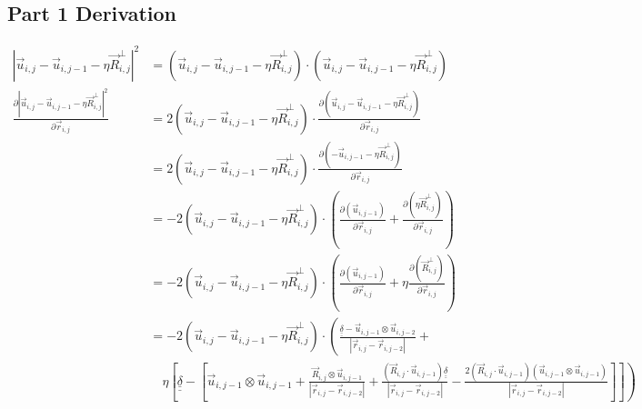 \documentclass{article}
\renewcommand{\ij}{_{i,j}}
\newcommand{\ijj}{_{i,j-1}}
\newcommand{\ijjj}{_{i,j-2}}
\newcommand{\magn}[1]{\left\vert #1 \right\vert }
\renewcommand{\part}[2]{\frac{\partial #1 }{\partial #2}}
\newcommand{\ten}[1]{\underline{\underline{#1}}}
\newcommand{\rij}{\vec{r} \ij}
\newcommand{\Rij}{\vec{R} \ij}
\newcommand{\rijjj}{\vec{r} \ijjj}
\newcommand{\uij}{\vec{u} \ij}
\newcommand{\uijj}{\vec{u} \ijj}
\newcommand{\uijjj}{\vec{u} \ijjj}
\begin{document}
\subsection{Part 1 Derivation}

\begin{align*}
  \magn{\uij - \uijj - \eta \Rij^\perp}^2 
  &=
  \left(\uij - \uijj - \eta \Rij^\perp\right)
  \cdot 
  \left(\uij - \uijj - \eta \Rij^\perp\right)
  \\
  \part{\magn{\uij - \uijj - \eta \Rij^\perp}^2 }{
    \rij 
  }
  &=
  2\left(\uij - \uijj - \eta \Rij^\perp\right) \cdot
  \part{\left(\uij - \uijj - \eta \Rij^\perp\right)}{\rij}
  \\
  &=
  2\left(\uij - \uijj - \eta \Rij^\perp\right) \cdot
  \part{\left(- \uijj - \eta \Rij^\perp\right)}{\rij}
  \\
  &=
  -
  2\left(\uij - \uijj - \eta \Rij^\perp\right) \cdot
  \left(
  \part{\left(\uijj \right)}{\rij}
  +
  \part{\left( \eta \Rij^\perp\right)}{\rij}
  \right)
  \\
  &=
  -
  2\left(\uij - \uijj - \eta \Rij^\perp\right) \cdot
  \left(
  \part{\left(\uijj \right)}{\rij}
  +
  \eta
  \part{\left( \Rij^\perp\right)}{\rij}
  \right)
  \\
  &=
  -
  2\left(\uij - \uijj - \eta \Rij^\perp\right) \cdot
  \left(
  \frac{\ten{\delta} - \uijj \otimes \uijjj}{\magn{\rij - \rijjj}}
  + \right. \\
  & \quad 
  \left. 
  \eta
  \left[
  \ten{\delta} 
  -
  \left[
  \uijj \otimes \uijj
  + 
  \frac{\Rij \otimes \uijj }{\magn{\rij - \rijjj}} 
  +
  \frac{ \left( 
    \Rij \cdot \uijj
    \right) \ten{\delta}}{\magn{\rij - \rijjj}}
  -
  \frac{
    2 \left(
      \Rij \cdot \uijj 
    \right)
    \left(\uijj \otimes \uijj 
    \right)
    }{\magn{\rij - \rijjj}}
  \right]
  \right]
  \right)
\end{align*}
\end{document}
